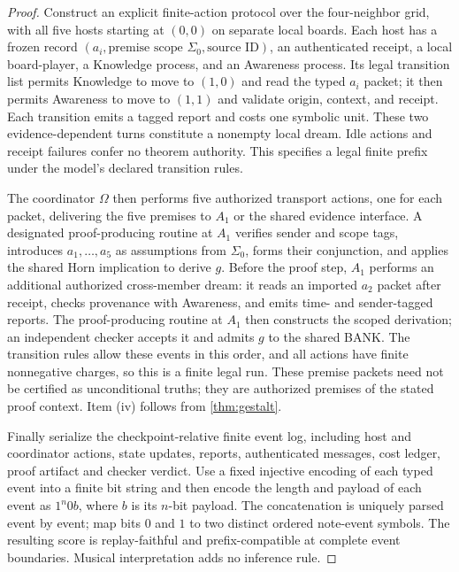 \documentclass[11pt,letterpaper]{article}
\theoremstyle{definition}
\theoremstyle{remark}
\begin{document}
\begin{proof}
Construct an explicit finite-action protocol over the four-neighbor grid, with all five hosts starting at $(0,0)$ on separate local boards. Each host has a frozen record $(a_i,\text{premise scope }\Sigma_0,\text{source ID})$, an authenticated receipt, a local board-player, a Knowledge process, and an Awareness process. Its legal transition list permits Knowledge to move to $(1,0)$ and read the typed $a_i$ packet; it then permits Awareness to move to $(1,1)$ and validate origin, context, and receipt. Each transition emits a tagged report and costs one symbolic unit. These two evidence-dependent turns constitute a nonempty local dream. Idle actions and receipt failures confer no theorem authority. This specifies a legal finite prefix under the model's declared transition rules.

The coordinator $\Omega$ then performs five authorized transport actions, one for each packet, delivering the five premises to $A_1$ or the shared evidence interface. A designated proof-producing routine at $A_1$ verifies sender and scope tags, introduces $a_1,\ldots,a_5$ as assumptions from $\Sigma_0$, forms their conjunction, and applies the shared Horn implication to derive $g$. Before the proof step, $A_1$ performs an additional authorized cross-member dream: it reads an imported $a_2$ packet after receipt, checks provenance with Awareness, and emits time- and sender-tagged reports. The proof-producing routine at $A_1$ then constructs the scoped derivation; an independent checker accepts it and admits $g$ to the shared BANK. The transition rules allow these events in this order, and all actions have finite nonnegative charges, so this is a finite legal run. These premise packets need not be certified as unconditional truths; they are authorized premises of the stated proof context. Item (iv) follows from \cref{thm:gestalt}.

Finally serialize the checkpoint-relative finite event log, including host and coordinator actions, state updates, reports, authenticated messages, cost ledger, proof artifact and checker verdict. Use a fixed injective encoding of each typed event into a finite bit string and then encode the length and payload of each event as $1^n0b$, where $b$ is its $n$-bit payload. The concatenation is uniquely parsed event by event; map bits $0$ and $1$ to two distinct ordered note-event symbols. The resulting score is replay-faithful and prefix-compatible at complete event boundaries. Musical interpretation adds no inference rule.
\end{proof}
\end{document}
